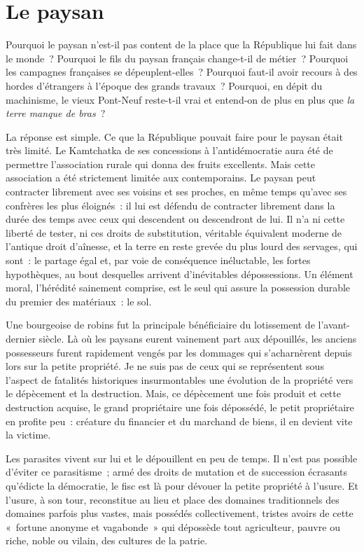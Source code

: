 \documentclass[french,twoside]{book} %
\newcommand{\astermono}{\medskip\centerline{\color{rubric}\large\selectfont{\syms ✻}}\medskip\par}%
\begin{document}
\section[Le paysan]{Le paysan}
\noindent Pourquoi le paysan n’est-il pas content de la place que la République lui fait dans le monde ? Pourquoi le fils du paysan français change-t-il de métier ? Pourquoi les campagnes françaises se dépeuplent-elles ? Pourquoi faut-il avoir recours à des hordes d’étrangers à l’époque des grands travaux ? Pourquoi, en dépit du machinisme, le vieux Pont-Neuf reste-t-il vrai et entend-on de plus en plus que \emph{la terre manque de bras} ?\par
La réponse est simple. Ce que la République pouvait faire pour le paysan était très limité. Le Kamtchatka de ses concessions à l’antidémocratie aura été de permettre l’association rurale qui donna des fruits excellents. Mais cette association a été strictement limitée aux contemporains. Le paysan peut contracter librement avec ses voisins et ses proches, en même temps qu’avec ses confrères les plus éloignés : il lui est défendu de contracter librement dans la durée des temps avec ceux qui descendent ou descendront de lui. Il n’a ni cette liberté de tester, ni ces droits de substitution, véritable équivalent moderne de l’antique droit d’aînesse, et la terre en reste grevée du plus lourd des servages, qui sont : le partage égal et, par voie de conséquence inéluctable, les fortes hypothèques, au bout desquelles arrivent d’inévitables dépossessions. Un élément moral, l’hérédité sainement comprise, est le seul qui assure la possession durable du premier des matériaux : le sol.\par

\astermono

\noindent Une bourgeoise de robins fut la principale bénéficiaire du lotissement de l’avant-dernier siècle. Là où les paysans eurent vainement part aux dépouillés, les anciens possesseurs furent rapidement vengés par les dommages qui s’acharnèrent depuis lors sur la petite propriété. Je ne suis pas de ceux qui se représentent sous l’aspect de fatalités historiques insurmontables une évolution de la propriété vers le dépècement et la destruction. Mais, ce dépècement une fois produit et cette destruction acquise, le grand propriétaire une fois dépossédé, le petit propriétaire en profite peu : créature du financier et du marchand de biens, il en devient vite la victime.\par
Les parasites vivent sur lui et le dépouillent en peu de temps. Il n’est pas possible d’éviter ce parasitisme ; armé des droits de mutation et de succession écrasants qu’édicte la démocratie, le fisc est là pour dévouer la petite propriété à l’usure. Et l’usure, à son tour, reconstitue au lieu et place des domaines traditionnels des domaines parfois plus vastes, mais possédés collectivement, tristes avoirs de cette « fortune anonyme et vagabonde » qui dépossède tout agriculteur, pauvre ou riche, noble ou vilain, des cultures de la patrie.\par
\end{document}
